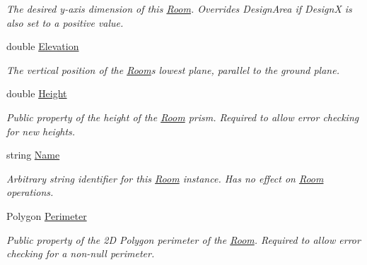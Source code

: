 \begin{DoxyCompactItemize}
\begin{DoxyCompactList}\small\item\em The desired y-\/axis dimension of this \mbox{\hyperlink{class_room_kit_1_1_room}{Room}}. Overrides Design\+Area if DesignX is also set to a positive value. \end{DoxyCompactList}\item 
double \mbox{\hyperlink{class_room_kit_1_1_room_a4239b90e74d80b830816970b84494136}{Elevation}}
\begin{DoxyCompactList}\small\item\em The vertical position of the \mbox{\hyperlink{class_room_kit_1_1_room}{Room}}\textquotesingle{}s lowest plane, parallel to the ground plane. \end{DoxyCompactList}\item 
double \mbox{\hyperlink{class_room_kit_1_1_room_a2e343291f564f8cba532bed978879106}{Height}}
\begin{DoxyCompactList}\small\item\em Public property of the height of the \mbox{\hyperlink{class_room_kit_1_1_room}{Room}} prism. Required to allow error checking for new heights. \end{DoxyCompactList}\item 
string \mbox{\hyperlink{class_room_kit_1_1_room_aabb40fd8aae88fa3a5c3b7ce6adee86e}{Name}}
\begin{DoxyCompactList}\small\item\em Arbitrary string identifier for this \mbox{\hyperlink{class_room_kit_1_1_room}{Room}} instance. Has no effect on \mbox{\hyperlink{class_room_kit_1_1_room}{Room}} operations. \end{DoxyCompactList}\item 
Polygon \mbox{\hyperlink{class_room_kit_1_1_room_abe9afa0fc1d95dc7469e80bdd411c26b}{Perimeter}}
\begin{DoxyCompactList}\small\item\em Public property of the 2D Polygon perimeter of the \mbox{\hyperlink{class_room_kit_1_1_room}{Room}}. Required to allow error checking for a non-\/null perimeter. \end{DoxyCompactList}\item 

\end{DoxyCompactItemize}
